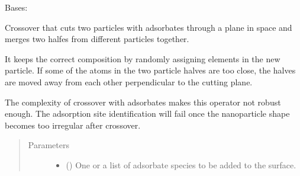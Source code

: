 \documentclass[letterpaper,10pt,english]{sphinxmanual}
\begin{document}

\begin{fulllineitems}
\label{\detokenize{ga:acat.ga.adsorbate_operators.CutSpliceCrossoverWithAdsorbates}}
Bases: {\hyperref[\detokenize{ga:acat.ga.adsorbate_operators.AdsorbateOperator}]{}}

Crossover that cuts two particles with adsorbates through a plane
in space and merges two halfes from different particles together.

It keeps the correct composition by randomly assigning elements in
the new particle. If some of the atoms in the two particle halves
are too close, the halves are moved away from each other perpendicular
to the cutting plane.

The complexity of crossover with adsorbates makes this operator not
robust enough. The adsorption site identification will fail once the
nanoparticle shape becomes too irregular after crossover.
\begin{quote}\begin{description}
\item[{Parameters}] \leavevmode\begin{itemize}
\item {} 
 () \textendash{} One or a list of adsorbate species to be added to the surface.


\end{itemize}
\end{description}
\end{quote}
\end{fulllineitems}
\end{document}
